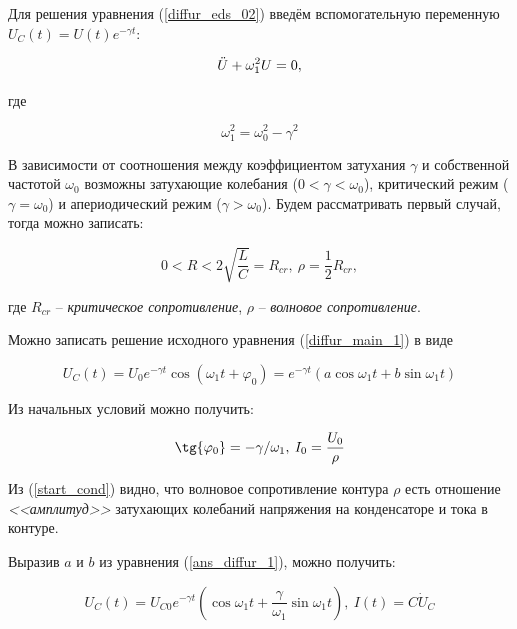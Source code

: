 \documentclass[a4paper, 12pt]{article}
\begin{document}
    Для решения уравнения (\ref{diffur_eds_02}) введём вспомогательную переменную $U_C(t) = U(t) e^{-\gamma t}$:

    \begin{equation}
        \Ddot{U} + \omega_1^2 U = 0,
        \label{diffur_main_1}
    \end{equation}

    где 

    \begin{equation}
        \omega_1^2 = \omega_0^2 - \gamma^2
        \label{omega_1}
    \end{equation}

    В зависимости от соотношения между коэффициентом затухания $\gamma$ и собственной частотой $\omega_0$ возможны затухающие колебания ($0 < \gamma < \omega_0$), критический режим ($\gamma = \omega_0$) и апериодический режим ($\gamma > \omega_0$). Будем рассматривать первый случай, тогда можно записать:

    \begin{equation}
        0 < R < 2 \sqrt{\frac{L}{C}} = R_{cr}, \: \rho = \frac{1}{2} R_{cr},
    \end{equation}

    где $R_{cr}$ -- \textit{критическое сопротивление}, $\rho$ -- \textit{волновое сопротивление}.

    Можно записать решение исходного уравнения (\ref{diffur_main_1}) в виде

    \begin{equation}
        U_C(t) = U_0 e^{-\gamma t} \cos(\omega_1 t + \varphi_0) = e^{-\gamma t} (a \cos{\omega_1 t} + b \sin{\omega_1 t})
        \label{ans_diffur_1}
    \end{equation}

    Из начальных условий можно получить:

    \begin{equation}
        \tg{\varphi_0} = -\gamma/\omega_1, \: I_0 = \frac{U_0}{\rho}
        \label{start_cond}
    \end{equation}

    Из (\ref{start_cond}) видно, что волновое сопротивление контура $\rho$ есть отношение \textit{<<амплитуд>>} затухающих колебаний напряжения на конденсаторе и тока в контуре.

    Выразив $a$ и $b$ из уравнения (\ref{ans_diffur_1}), можно получить:

    \begin{equation}
        U_C(t) = U_{C0} e^{-\gamma t} \left( \cos{\omega_1 t} + \frac{\gamma}{\omega_1} \sin{\omega_1 t} \right), \: I(t) = C\Dot{U}_C
        \label{phase}
    \end{equation}
\end{document}

